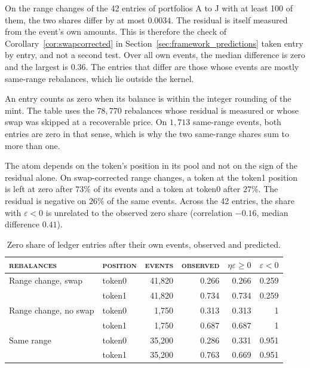 \documentclass[11pt,a4paper]{article}
\DeclareRobustCommand{\thd}[1]{{\scshape\addfontfeatures{LetterSpace=1.5}\MakeLowercase{#1}}}
\theoremstyle{siphon}
\begin{document}
On the range changes of the 42 entries of portfolios A to J with at least 100 of them, the two shares differ by at most $0.0034$. The residual is itself measured from the event's own amounts. This is therefore the check of Corollary~\ref{cor:swapcorrected} in Section~\ref{sec:framework_predictions} taken entry by entry, and not a second test. Over all own events, the median difference is zero and the largest is $0.36$. The entries that differ are those whose events are mostly same-range rebalances, which lie outside the kernel.

An entry counts as zero when its balance is within the integer rounding of the mint. The table uses the $78{,}770$ rebalances whose residual is measured or whose swap was skipped at a recoverable price. On $1{,}713$ same-range events, both entries are zero in that sense, which is why the two same-range shares sum to more than one.

The atom depends on the token's position in its pool and not on the sign of the residual alone. On swap-corrected range changes, a token at the token1 position is left at zero after $73\%$ of its events and a token at token0 after $27\%$. The residual is negative on $26\%$ of the same events. Across the 42 entries, the share with $\varepsilon < 0$ is unrelated to the observed zero share (correlation $-0.16$, median difference $0.41$).
\begin{table}[!htb]
\centering
\caption{Zero share of ledger entries after their own events, observed and predicted.}
\label{tab:zero_share}
\begin{tabular}{@{}llrrrr@{}}
\toprule
\thd{Rebalances} & \thd{Position} & \thd{Events} & \thd{Observed} & $\eta\varepsilon \geq 0$ & $\varepsilon < 0$  \\
\midrule
Range change, swap      & token0 & 41{,}820 & 0.266 & 0.266 & 0.259 \\
                        & token1 & 41{,}820 & 0.734 & 0.734 & 0.259 \\
Range change, no swap   & token0 & 1{,}750  & 0.313 & 0.313 & 1 \\
                        & token1 & 1{,}750  & 0.687 & 0.687 & 1 \\
Same range              & token0 & 35{,}200 & 0.286 & 0.331 & 0.951 \\
                        & token1 & 35{,}200 & 0.763 & 0.669 & 0.951 \\
\bottomrule
\end{tabular}
\end{table}
\end{document}
